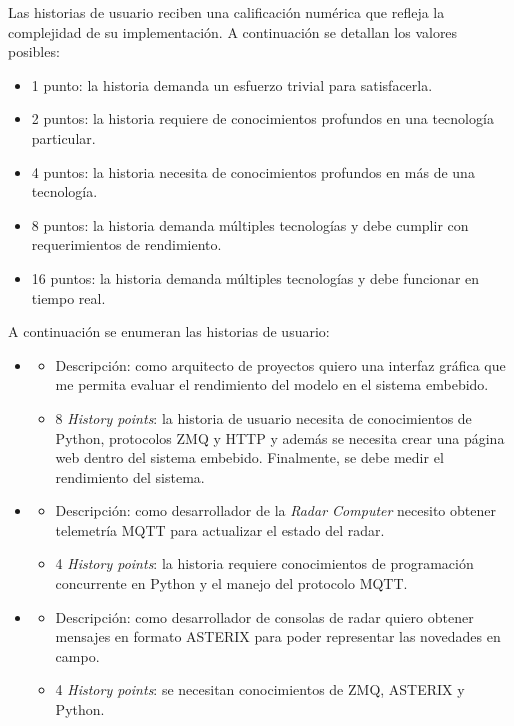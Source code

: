 \documentclass[
11pt, %
]{charter}
\begin{document}
Las historias de usuario reciben una calificación numérica que refleja la
complejidad de su implementación.
A continuación se detallan los valores posibles:

\begin{itemize}
\item 1 punto: la historia demanda un esfuerzo trivial para satisfacerla.
\item 2 puntos: la historia requiere de conocimientos profundos en una
  tecnología particular.
\item 4 puntos: la historia necesita de conocimientos profundos en más de una tecnología.
\item 8 puntos: la historia demanda múltiples tecnologías y debe cumplir con
  requerimientos de rendimiento.
\item 16 puntos: la historia demanda múltiples tecnologías y debe funcionar en
  tiempo real.
\end{itemize}

A continuación se enumeran las historias de usuario:

\begin{itemize}
  \item
    \begin{itemize}
      \item Descripción: como arquitecto de proyectos quiero una interfaz gráfica que me permita
        evaluar el rendimiento del modelo en el sistema embebido.
      \item 8 \emph{History points}: la historia de usuario necesita de
        conocimientos de Python, protocolos ZMQ y HTTP y además se necesita crear
        una página web dentro del sistema embebido. Finalmente, se debe medir el
        rendimiento del sistema.
    \end{itemize}
  \item
    \begin{itemize}
      \item Descripción: como desarrollador de la \emph{Radar Computer} necesito obtener
        telemetría MQTT para actualizar el estado del radar.
      \item 4 \emph{History points}: la historia requiere conocimientos de
        programación concurrente en Python y el manejo del protocolo MQTT.
    \end{itemize}
  \item
    \begin{itemize}
      \item Descripción: como desarrollador de consolas de radar quiero obtener mensajes en
        formato ASTERIX para poder representar las novedades en campo.
      \item 4 \emph{History points}: se necesitan conocimientos de ZMQ, ASTERIX
        y Python.
    \end{itemize}
\end{itemize}
\end{document}
